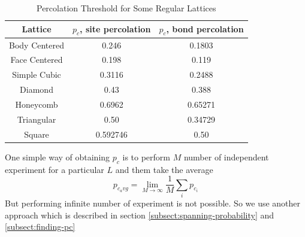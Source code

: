 	\begin{table}[h]
		\centering
		\begin{tabular}{|c|c|c|}
			\hline
			Lattice & $p_c$, site percolation & $p_c$, bond percolation \\ 		\hline
			Body Centered & 0.246 & 0.1803 \\ 		\hline
			Face Centered & 0.198 &  0.119 \\ 		\hline
			Simple Cubic & 0.3116 & 0.2488 \\ 		\hline
			Diamond & 0.43 & 0.388 \\ 		\hline
			Honeycomb & 0.6962 & 0.65271 \\ 		\hline
			Triangular & 0.50 & 0.34729 \\ 		\hline
			Square & 0.592746 & 0.50 \\ 		\hline
		\end{tabular}
		\caption{Percolation Threshold for Some Regular Lattices}
		\label{tab:percolation-threshold}
	\end{table}
	One simple way of obtaining $p_c$ is to perform $M$ number of independent experiment for a particular $L$ and them take the average 
	\begin{equation}
		p_{c_avg} = \lim_{M\rightarrow\infty}\frac{1}{M} \sum_{i} p_{c_i}
	\end{equation}
	But performing infinite number of experiment is not possible. So we use another approach which is described in section \ref{subsect:spanning-probability} and \ref{subsect:finding-pc}
	
	
	
